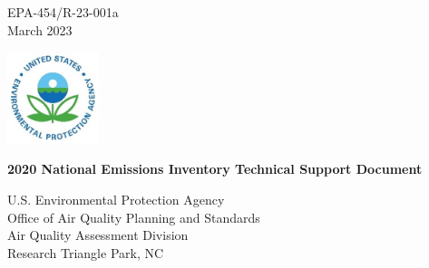 \thispagestyle{empty}

\begin{flushright}
EPA-454/R-23-001a \\
March 2023
\end{flushright}

\includegraphics[width=0.20\textwidth]{figures/epa-logo.jpg}

\begin{center}
\textbf{\Large{2020 National Emissions Inventory Technical Support Document}}
\end{center}

\vspace{0.60\textheight}

\begin{center}
U.S. Environmental Protection Agency \\
Office of Air Quality Planning and Standards \\
Air Quality Assessment Division \\
Research Triangle Park, NC
\end{center}

